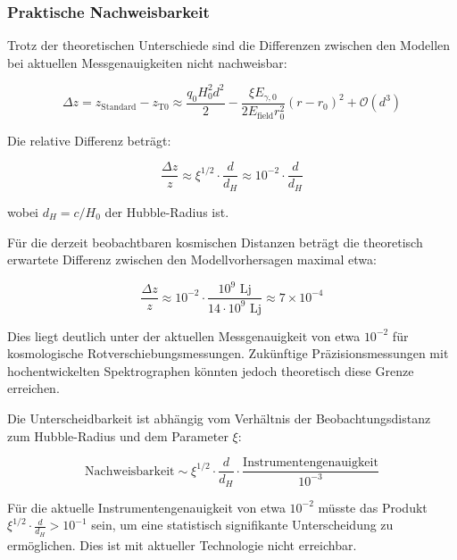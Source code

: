 \documentclass[12pt,a4paper]{article}
\theoremstyle{definition}
\begin{document}
\subsubsection{Praktische Nachweisbarkeit}

Trotz der theoretischen Unterschiede sind die Differenzen zwischen den Modellen bei aktuellen Messgenauigkeiten nicht nachweisbar:

\begin{equation}
	\Delta z = z_{\text{Standard}} - z_{\text{T0}} \approx \frac{q_0 H_0^2 d^2}{2} - \frac{\xi E_{\gamma,0}}{2E_{\text{field}}r_0^2}(r-r_0)^2 + \mathcal{O}(d^3)
\end{equation}

Die relative Differenz beträgt:

\begin{equation}
	\frac{\Delta z}{z} \approx \xi^{1/2} \cdot \frac{d}{d_H} \approx 10^{-2} \cdot \frac{d}{d_H}
\end{equation}

wobei $d_H = c/H_0$ der Hubble-Radius ist.

\begin{wichtig}
	Für die derzeit beobachtbaren kosmischen Distanzen beträgt die theoretisch erwartete Differenz zwischen den Modellvorhersagen maximal etwa:
	
	\begin{equation}
		\frac{\Delta z}{z} \approx 10^{-2} \cdot \frac{10^9 \text{ Lj}}{14 \cdot 10^9 \text{ Lj}} \approx 7 \times 10^{-4}
	\end{equation}
	
	Dies liegt deutlich unter der aktuellen Messgenauigkeit von etwa $10^{-2}$ für kosmologische Rotverschiebungsmessungen. Zukünftige Präzisionsmessungen mit hochentwickelten Spektrographen könnten jedoch theoretisch diese Grenze erreichen.
\end{wichtig}

\begin{verhaltnis}
	Die Unterscheidbarkeit ist abhängig vom Verhältnis der Beobachtungsdistanz zum Hubble-Radius und dem Parameter $\xi$:
	
	\begin{equation}
		\text{Nachweisbarkeit} \sim \xi^{1/2} \cdot \frac{d}{d_H} \cdot \frac{\text{Instrumentengenauigkeit}}{10^{-3}}
	\end{equation}
	
	Für die aktuelle Instrumentengenauigkeit von etwa $10^{-2}$ müsste das Produkt $\xi^{1/2} \cdot \frac{d}{d_H} > 10^{-1}$ sein, um eine statistisch signifikante Unterscheidung zu ermöglichen. Dies ist mit aktueller Technologie nicht erreichbar.
\end{verhaltnis}
\end{document}
